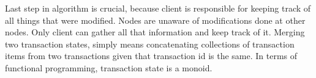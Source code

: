         

 

Last step in algorithm is crucial, because client is responsible for keeping track of all things that were modified. Nodes are unaware of modifications done at other nodes. Only client can gather all that information and keep track of it.
        Merging two transaction states, simply means concatenating collections of transaction items from two transactions given that transaction id is the same. In terms of functional programming, transaction state is a monoid.
